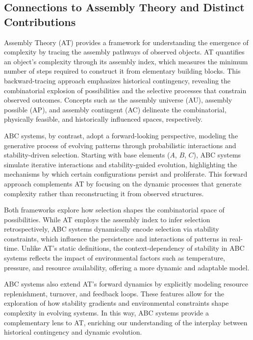 \documentclass[entropy,article,submit,pdftex,oneauthor]{Definitions/mdpi}
\begin{document}
\subsection{Connections to Assembly Theory and Distinct Contributions}

Assembly Theory (AT) \cite{walker2023nature} provides a framework for understanding the emergence of complexity by tracing the assembly pathways of observed objects. AT quantifies an object’s complexity through its assembly index, which measures the minimum number of steps required to construct it from elementary building blocks. This backward-tracing approach emphasizes historical contingency, revealing the combinatorial explosion of possibilities and the selective processes that constrain observed outcomes. Concepts such as the assembly universe (AU), assembly possible (AP), and assembly contingent (AC) delineate the combinatorial, physically feasible, and historically influenced spaces, respectively.

ABC systems, by contrast, adopt a forward-looking perspective, modeling the generative process of evolving patterns through probabilistic interactions and stability-driven selection. Starting with base elements ($A$, $B$, $C$), ABC systems simulate iterative interactions and stability-guided evolution, highlighting the mechanisms by which certain configurations persist and proliferate. This forward approach complements AT by focusing on the dynamic processes that generate complexity rather than reconstructing it from observed structures.

Both frameworks explore how selection shapes the combinatorial space of possibilities. While AT employs the assembly index to infer selection retrospectively, ABC systems dynamically encode selection via stability constraints, which influence the persistence and interactions of patterns in real-time. Unlike AT’s static definitions, the context-dependency of stability in ABC systems reflects the impact of environmental factors such as temperature, pressure, and resource availability, offering a more dynamic and adaptable model.

ABC systems also extend AT’s forward dynamics by explicitly modeling resource replenishment, turnover, and feedback loops. These features allow for the exploration of how stability gradients and environmental constraints shape complexity in evolving systems. In this way, ABC systems provide a complementary lens to AT, enriching our understanding of the interplay between historical contingency and dynamic evolution.
\end{document}
